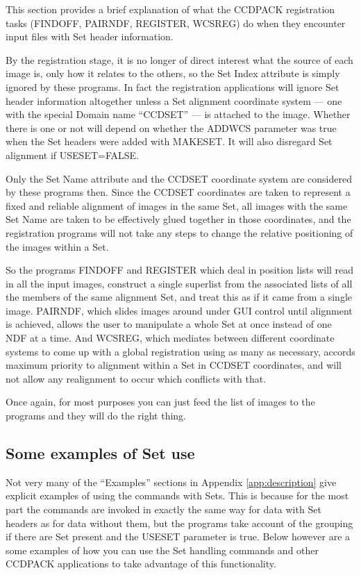 \documentclass[twoside,11pt]{article}
\newcommand{\htmlref}[2]{#1}
\renewcommand{\_}{\texttt{\symbol{95}}}
\newcommand{\routine}[1]{{\sc #1}}
\newcommand{\xroutine}[1]{\htmlref{{\sc #1}}{#1}}
\begin{document}
This section provides a brief explanation of what the CCDPACK
registration tasks 
(\xroutine{FINDOFF}, \xroutine{PAIRNDF}, 
\xroutine{REGISTER}, \xroutine{WCSREG})
do when they encounter input files with Set header information.

By the registration stage, it is no longer of direct interest
what the source of each image is, only how it relates to the
others, so the Set Index attribute is simply ignored by these programs.
In fact the registration applications will ignore Set header information
altogether unless a Set alignment coordinate system 
--- one with the special Domain name ``CCD\_SET'' ---
is attached to the image.
Whether there is one or not will depend on whether the 
ADDWCS parameter was true when the Set headers were added
with \xroutine{MAKESET}.
It will also disregard Set alignment if USESET=FALSE.

Only the Set Name attribute and the CCD\_SET coordinate system
are considered by these programs then.
Since the CCD\_SET coordinates are taken to represent 
a fixed and reliable alignment of images in the same Set,
all images with the same Set Name are taken to be effectively 
glued together in those coordinates, and the registration programs
will not take any steps to change the relative positioning of 
the images within a Set.  

So the programs 
\routine{FINDOFF} and \routine{REGISTER} which deal in position lists
will read in all the input images, construct a single superlist from
the associated lists of 
all the members of the same alignment Set, and treat this as if
it came from a single image.
\routine{PAIRNDF}, which slides images around under GUI control until
alignment is achieved, allows the user to manipulate a whole Set at
once instead of one NDF at a time.
And \routine{WCSREG}, which mediates between different coordinate
systems to come up with a global registration using as many as necessary,
accords maximum priority to alignment within a Set in CCD\_SET 
coordinates, and will not allow any realignment to occur which conflicts
with that.

Once again, for most purposes you can just feed the list of 
images to the programs and they will do the right thing.

\subsection{Some examples of Set use}

Not very many of the ``Examples'' sections in Appendix 
\ref{app:description} give explicit examples of using the commands
with Sets.
This is because for the most part the commands are invoked in 
exactly the same way for data with Set headers as for data without them,
but the programs take account of the grouping if there are Set present
and the USESET parameter is true.
Below however are a some examples of how you can use the Set handling
commands and other CCDPACK applications to take advantage of this
functionality.
\end{document}
